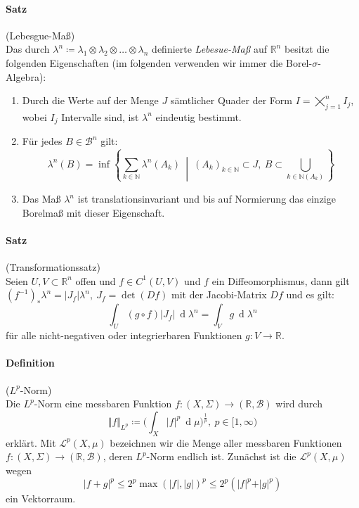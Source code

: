 \documentclass[12pt,a4paper,fleqn]{article}
\def\set#1{{\left\{ #1 \right\}}}
\def\Mid{\ \middle|\ }
\def\d{{\operatorname{d}}}
\begin{document}
\paragraph{Satz} (Lebesgue-Maß)\\
Das durch $\lambda^n \coloneqq \lambda_1 \otimes \lambda_2 \otimes \dots \otimes \lambda_n$ definierte \textit{Lebesue-Maß} auf $\mathbb{R}^n$ besitzt die folgenden Eigenschaften (im folgenden verwenden wir immer die Borel-$\sigma$-Algebra):
\begin{enumerate}
\item Durch die Werte auf der Menge $J$ sämtlicher Quader der Form $I = \bigtimes_{j=1}^n I_j$, wobei $I_j$ Intervalle sind, ist $\lambda^n$ eindeutig bestimmt.
\item Für jedes $B \in \mathcal{B}^n$ gilt:
\begin{displaymath}
\lambda^n(B) = \inf \set{\sum_{k \in \mathbb{N}} \lambda^n(A_k) \Mid (A_k)_{k \in \mathbb{N}} \subset J,\ B \subset \bigcup_{k \in \mathbb{N} (A_k)}}
\end{displaymath}
\item Das Maß $\lambda^n$ ist translationsinvariant und bis auf Normierung das einzige Borelmaß mit dieser Eigenschaft.
\end{enumerate}

\paragraph{Satz} (Transformationssatz)\\
Seien $U, V \subset \mathbb{R}^n$ offen und $f \in C^1(U, V)$ und $f$ ein Diffeomorphismus, dann gilt $(f^{-1}) _\ast \lambda^n = \vert J_f \vert \lambda^n,\ J_f = \det(Df)$
 mit der Jacobi-Matrix $Df$ und es gilt:
\begin{displaymath}
\int_U (g \circ f)\vert J_f \vert\ \d\lambda^n = \int_V g\ \d\lambda^n
\end{displaymath}
für alle nicht-negativen oder integrierbaren Funktionen $g\colon V \rightarrow \mathbb{R}$.

\paragraph{Definition} ($L^p$-Norm)\\
Die $L^p$-Norm eine messbaren Funktion $f\colon (X, \Sigma) \rightarrow (\mathbb{R}, \mathcal{B})$ wird durch
\begin{displaymath}
\Vert f \Vert _{L^p} \coloneqq \bigg( \int_X \vert f \vert ^p\ \d\mu \bigg)^{\frac{1}{p}},\ p \in [1, \infty)
\end{displaymath}
erklärt. Mit $\mathscr{L}^p(X, \mu)$ bezeichnen wir die Menge aller messbaren Funktionen\linebreak \mbox{$f\colon (X, \Sigma) \rightarrow (\mathbb{R}, \mathcal{B})$}, deren $L^p$-Norm endlich ist. Zunächst ist die $\mathscr{L}^p(X, \mu)$ wegen
\begin{displaymath}
\vert f + g \vert ^p \leq 2^p \max(\vert f \vert, \vert g \vert)^p \leq 2^p (\vert f \vert ^p + \vert g \vert ^p)
\end{displaymath}
ein Vektorraum.
\end{document}
